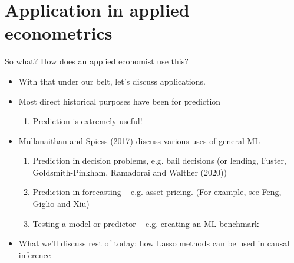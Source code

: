   \section{Application in applied econometrics}
  \frame{\sectionpage}

  \begin{frame}{So what? How does an applied economist use this?}
    \begin{itemize}
    \item   With that under our belt, let's discuss applications.
    \item Most direct historical purposes have been for prediction
      \begin{enumerate}[-]
      \item Prediction is extremely useful! 
      \end{enumerate}
    \item Mullanaithan and Spiess (2017) discuss various uses of general ML
      \begin{enumerate}[-]
      \item Prediction in decision problems, e.g. bail decisions (or
        lending, Fuster, Goldsmith-Pinkham, Ramadorai and Walther
        (2020))
      \item Prediction in forecasting -- e.g. asset pricing. (For example, see Feng, Giglio and Xiu)
      \item Testing a model or predictor -- e.g. creating an ML
        benchmark 
      \end{enumerate}
    \item What we'll discuss rest of today: how Lasso methods can be
      used in causal inference
    \end{itemize}
  \end{frame}
  
